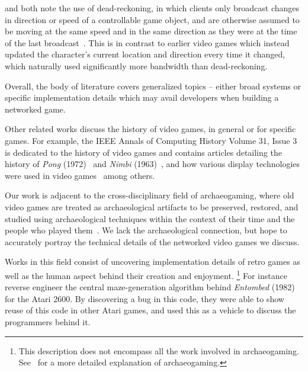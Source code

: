 \citet{Das1997NetEffect} and \citet{Blau1992NetworkedEnvironments} both note the use of dead-reckoning, in which clients only broadcast changes in direction or speed of a controllable game object, and are otherwise assumed to be moving at the same speed and in the same direction as they were at the time of the last broadcast~\cite{Blau1992NetworkedEnvironments}. This is in contrast to earlier video games which instead updated the character's current location and direction every time it changed, which naturally used significantly more bandwidth than dead-reckoning.

Overall, the body of literature covers generalized topics -- either broad systems or specific implementation details which may avail developers when building a networked game.

Other related works discuss the history of video games, in general or for specific games. For example, the IEEE Annals of Computing History Volume 31, Issue 3 is dedicated to the history of video games and contains articles detailing the history of \textit{Pong} (1972)~\cite{lowood} and \textit{Nimbi} (1963)~\cite{jorgensen}, and how various display technologies were used in video games~\cite{bogost} among others.

Our work is adjacent to the cross-disciplinary field of archaeogaming, where old video games are treated as archaeological artifacts to be preserved, restored, and studied using archaeological techniques within the context of their time and the people who played them~\cite{aycock}. We lack the archaeological connection, but hope to accurately portray the technical details of the networked video games we discuss.

Works in this field consist of uncovering implementation details of retro games as well as the human aspect behind their creation and enjoyment.
\footnote{This description does not encompass all the work involved in archaeogaming. See~\cite{aycock} for a more detailed explanation of archaeogaming.}
For instance \citet{Aycock2018} reverse engineer the central maze-generation algorithm behind \textit{Entombed} (1982) for the Atari 2600. By discovering a bug in this code, they were able to show reuse of this code in other Atari games, and used this as a vehicle to discuss the programmers behind it.
